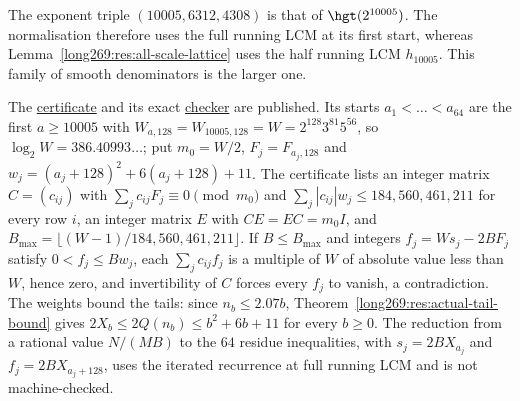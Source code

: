 The exponent triple $(10005,6312,4308)$ is that of $\hgt(2^{10005})$.
The normalisation therefore uses the full running LCM at its first
start, whereas Lemma~\ref{long269:res:all-scale-lattice} uses the half
running LCM $h_{10005}$.  This family of smooth denominators is the
larger one.

The
\href{https://github.com/wcook04/plectis-erdos/blob/f757115e03bebe5c04431a147da559015c680a37/research/experiments/erdos269/large-computations/regenerated/block_certificate.json}{certificate}
and its exact
\href{https://github.com/wcook04/plectis-erdos/blob/f757115e03bebe5c04431a147da559015c680a37/research/experiments/erdos269/large-computations/verify_recovered.py}{checker}
are published.  Its starts $a_1<\dots<a_{64}$ are the first $a\ge10005$
with $W_{a,128}=W_{10005,128}=W=2^{128}3^{81}5^{56}$, so
$\log_2W=386.40993\ldots$; put $m_0=W/2$, $F_j=F_{a_j,128}$ and
$w_j=(a_j+128)^2+6(a_j+128)+11$.  The certificate lists an integer
matrix $C=(c_{ij})$ with $\sum_jc_{ij}F_j\equiv0\pmod{m_0}$ and
$\sum_j|c_{ij}|w_j\le184{,}560{,}461{,}211$ for every row $i$, an
integer matrix $E$ with $CE=EC=m_0I$, and
$B_{\max}=\lfloor(W-1)/184{,}560{,}461{,}211\rfloor$.  If
$B\le B_{\max}$ and integers $f_j=Ws_j-2BF_j$ satisfy $0<f_j\le Bw_j$,
each $\sum_jc_{ij}f_j$ is a multiple of $W$ of absolute value less than
$W$, hence zero, and invertibility of $C$ forces every $f_j$ to vanish,
a contradiction.  The weights bound the tails: since $n_b\le2.07b$,
Theorem~\ref{long269:res:actual-tail-bound} gives
$2X_b\le2Q(n_b)\le b^2+6b+11$ for every $b\ge0$.  The reduction from a
rational value $N/(MB)$ to the $64$ residue inequalities, with
$s_j=2BX_{a_j}$ and $f_j=2BX_{a_j+128}$, uses the iterated recurrence at full
running LCM and is not machine-checked.

